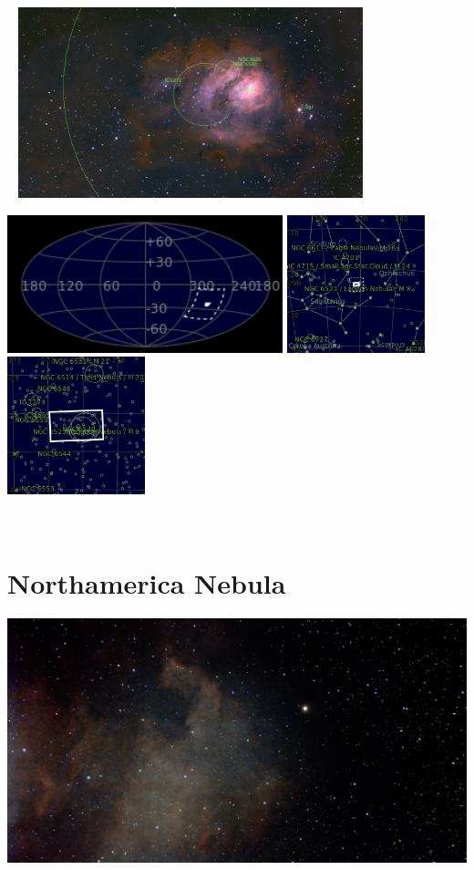 \begin{center}
 \ \newpage
\includegraphics[width=0.75\textwidth]{../Imaging//Annotated/Lagoon_Nebula_Annotated.jpg}

\includegraphics[height=4cm]{../Imaging//Annotated/Lagoon_Nebula_Globe.jpg}
\includegraphics[height=4cm]{../Imaging//Annotated/Lagoon_Nebula_Close.jpg}
\includegraphics[height=4cm]{../Imaging//Annotated/Lagoon_Nebula_Closer.jpg}
\end{center}
\ \\\section{Northamerica Nebula}
\includegraphics[width=\textwidth]{../Imaging//Original/Northamerica_Nebula.jpg}
